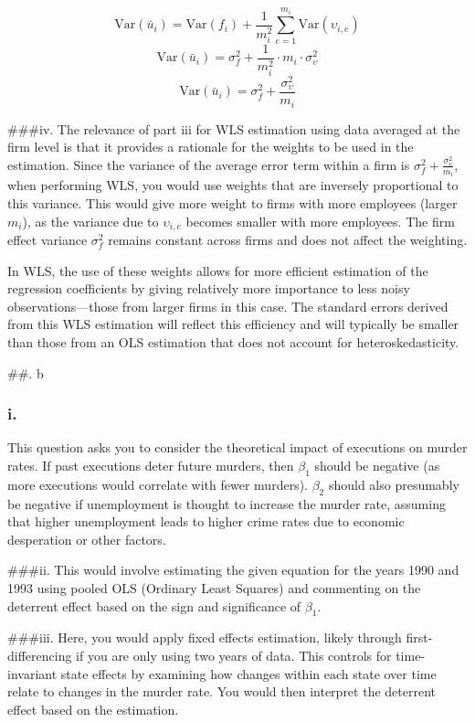 \documentclass[
]{article}
\begin{document}
\[ \text{Var}(\bar{u}_i) = \text{Var}(f_i) + \frac{1}{m_i^2} \sum_{e=1}^{m_i} \text{Var}(\upsilon_{i,e}) \]
\[ \text{Var}(\bar{u}_i) = \sigma_f^2 + \frac{1}{m_i^2} \cdot m_i \cdot \sigma_\upsilon^2 \]
\[ \text{Var}(\bar{u}_i) = \sigma_f^2 + \frac{\sigma_\upsilon^2}{m_i} \]

\#\#\#iv. The relevance of part iii for WLS estimation using data
averaged at the firm level is that it provides a rationale for the
weights to be used in the estimation. Since the variance of the average
error term within a firm is
\(\sigma_f^2 + \frac{\sigma_\upsilon^2}{m_i}\), when performing WLS, you
would use weights that are inversely proportional to this variance. This
would give more weight to firms with more employees (larger \(m_i\)), as
the variance due to \(\upsilon_{i,e}\) becomes smaller with more
employees. The firm effect variance \(\sigma_f^2\) remains constant
across firms and does not affect the weighting.

In WLS, the use of these weights allows for more efficient estimation of
the regression coefficients by giving relatively more importance to less
noisy observations---those from larger firms in this case. The standard
errors derived from this WLS estimation will reflect this efficiency and
will typically be smaller than those from an OLS estimation that does
not account for heteroskedasticity.

\#\#. b

\hypertarget{i.-1}{%
\subsubsection{i.}\label{i.-1}}

This question asks you to consider the theoretical impact of executions
on murder rates. If past executions deter future murders, then
\(\beta_1\) should be negative (as more executions would correlate with
fewer murders). \(\beta_2\) should also presumably be negative if
unemployment is thought to increase the murder rate, assuming that
higher unemployment leads to higher crime rates due to economic
desperation or other factors.

\#\#\#ii. This would involve estimating the given equation for the years
1990 and 1993 using pooled OLS (Ordinary Least Squares) and commenting
on the deterrent effect based on the sign and significance of
\(\beta_1\).

\#\#\#iii. Here, you would apply fixed effects estimation, likely
through first-differencing if you are only using two years of data. This
controls for time-invariant state effects by examining how changes
within each state over time relate to changes in the murder rate. You
would then interpret the deterrent effect based on the estimation.
\end{document}

